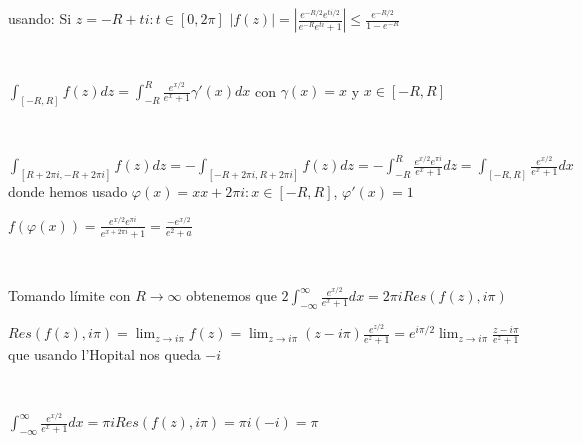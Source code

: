 usando:
Si $z= -R+ti : t\in[0,2\pi]$
$|f(z)| = \left| \frac{e^{-R/2}e^{ti/2}}{e^{-R}e^{ti}+1} \right| \leq \frac{e^{-R/2}}{1-e^{-R}}$

\

$\int_{[-R,R]} f(z)dz = \int_{-R}^{R} \frac{e^{x/2}}{e^x+1} \gamma'(x)dx$ con $\gamma(x)=x$ y $x\in[-R,R]$

\

$\int_{[R+2\pi i, -R+2\pi i]} f(z)dz = -\int_{[-R+2\pi i, R+2\pi i]} f(z)dz = -\int_{-R}^{R} \frac{e^{x/2}e^{\pi i}}{e^x+1}dz = \int_{[-R,R]} \frac{e^{x/2}}{e^x+1}dx$
donde hemos usado
$\varphi (x) = xx+2\pi i : x\in[-R,R]$, $\varphi'(x) = 1$

$f(\varphi(x)) = \frac{e^{x/2}e^{\pi i}}{e^{x+2\pi i}+1} = \frac{-e^{x/2}}{e^2+a}$

\

Tomando límite con $R\rightarrow\infty$ obtenemos que
$2\int_{-\infty}^{\infty} \frac{e^{x/2}}{e^x+1} dx = 2\pi iRes(f(z),i\pi)$

$Res(f(z),i\pi) = \lim_{z\rightarrow i\pi} f(z) = \lim_{z\rightarrow i\pi} (z-i\pi) \frac{e^{z/2}}{e^z+1} = e^{i\pi/2} \lim_{z\rightarrow i\pi} \frac{z-i\pi}{e^z+1}$
que usando l'Hopital nos queda
$-i$

\

$\int_{-\infty}^{\infty} \frac{e^{x/2}}{e^x+1} dx = \pi iRes(f(z),i\pi) = \pi i(-i) = \pi $

